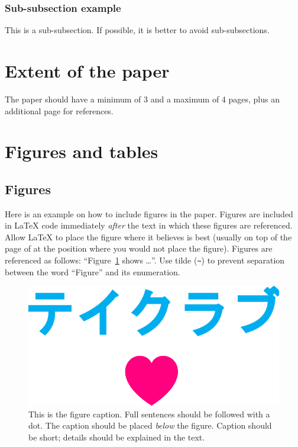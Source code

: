 \documentclass[10pt, a4paper]{article}
\begin{document}
\subsubsection{Sub-subsection example} 

This is a sub-subsection. If possible, it is better to avoid sub-subsections. 

\section{Extent of the paper}

The paper should have a minimum of 3 and a maximum of 4 pages, plus an additional page for references.

\section{Figures and tables}

\subsection{Figures}

Here is an example on how to include figures in the paper. Figures are included in \LaTeX{} code immediately \textit{after} the text in which these figures are referenced. Allow \LaTeX{} to place the figure where it believes is best (usually on top of the page of at the position where you would not place the figure). Figures are referenced as follows: ``Figure~\ref{fig:figure1} shows \dots''. Use tilde (\verb.~.) to prevent separation between the word ``Figure'' and its enumeration. 

\begin{figure}
\begin{center}
\includegraphics[width=\columnwidth]{drawing.pdf}
\caption{This is the figure caption. Full sentences should be followed with a dot. The caption should be placed \textit{below} the figure. Caption should be short; details should be explained in the text.}
\label{fig:figure1}
\end{center}
\end{figure}
\end{document}
